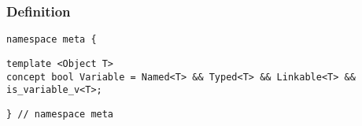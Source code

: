 
\subsubsection{Definition}

\begin{verbatim}
namespace meta {
\end{verbatim}
\begin{verbatim}
template <Object T>
concept bool Variable = Named<T> && Typed<T> && Linkable<T> && is_variable_v<T>;

\end{verbatim}
\begin{verbatim}
} // namespace meta
\end{verbatim}
